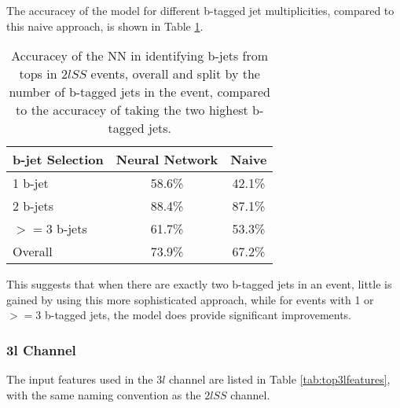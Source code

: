 The accuracey of the model for different b-tagged jet multiplicities, compared to this naive approach, is shown in Table \ref{tab:topMatchAcc2lSS}.

\begin{table}[H]
  \centering
  \begin{tabular}{l|c|c}
    \hline\hline
    b-jet Selection & Neural Network & Naive \\
    \hline
    1 b-jet & 58.6\% & 42.1\% \\
    2 b-jets & 88.4\% & 87.1\% \\
    $>=$3 b-jets & 61.7\% & 53.3\% \\
    \hline
    Overall & 73.9\% & 67.2\% \\                                                                                  
    \hline                                                                                                 
  \end{tabular}
  \caption{Accuracey of the NN in identifying b-jets from tops in $2lSS$ events, overall and split by the number of b-tagged jets in the event, compared to the accuracey of taking the two highest b-tagged jets.}     
  \label{tab:topMatchAcc2lSS}                                                                                           
\end{table}

This suggests that when there are exactly two b-tagged jets in an event, little is gained by using this more sophisticated approach, while for events with 1 or $>=3$ b-tagged jets, the model does provide significant improvements.

\subsubsection{3l Channel}
\label{subsec:top3l}
 
The input features used in the $3l$  channel are listed in Table \ref{tab:top3lfeatures}, with the same naming convention as the $2lSS$ channel.

